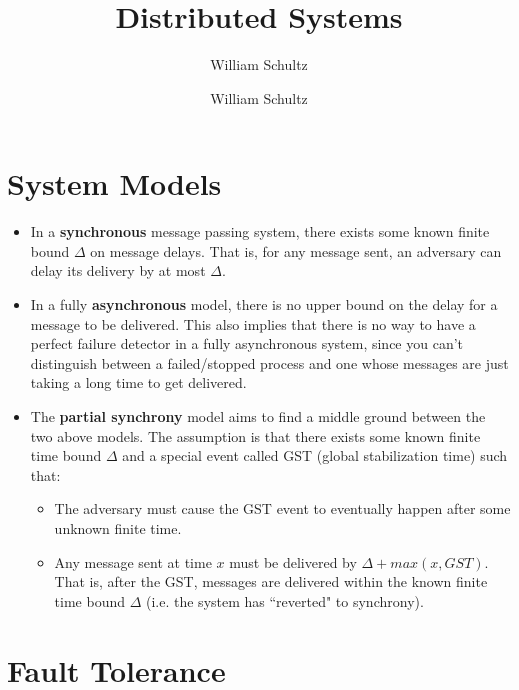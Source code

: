 \documentclass[10pt,a4paper]{article}
\author{William Schultz}
\begin{document}
\title{Distributed Systems}
\author{William Schultz}
\maketitle

\section*{System Models}

\begin{itemize}
    \item In a \textbf{synchronous} message passing system, there exists some known finite bound $\Delta$ on message delays. That is, for any message sent, an adversary can delay its delivery by at most $\Delta$.
    \item  In a fully \textbf{asynchronous} model, there is no upper bound on the delay for a message to be delivered. This also implies that there is no way to have a perfect failure detector in a fully asynchronous system, since you can't distinguish between a failed/stopped process and one whose messages are just taking a long time to get delivered.
    \item The \textbf{partial synchrony} model aims to find a middle ground between the two above models. The assumption is that there exists some known finite time bound $\Delta$ and a special event called GST (global stabilization time) such that:
    \begin{itemize}
        \item The adversary must cause the GST event to eventually happen after some unknown finite time.
        \item Any message sent at time $x$ must be delivered by $\Delta + max(x, GST)$. That is, after the GST, messages are delivered within the known finite time bound $\Delta$ (i.e. the system has ``reverted" to synchrony).
    \end{itemize}
\end{itemize}

\section*{Fault Tolerance}
\end{document}
